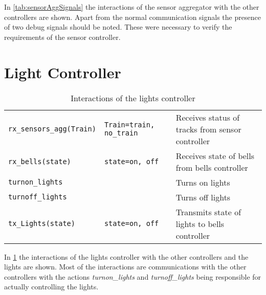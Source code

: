 \documentclass[final]{report}
\begin{document}
In \cref{tab:sensorAggSignals} the interactions of the sensor aggregator with the other controllers are shown.
Apart from the normal communication signals the presence of two debug signals should be noted.
These were necessary to verify the requirements of the sensor controller.

\section{Light Controller}
\begin{table}[H]
\centering
    \begin{tabular}{|l|l|l|}
    \hline
    \texttt{rx\_sensors\_agg(Train)} & \texttt{Train=train, no\_train} & Receives status of tracks from sensor controller \\
    \texttt{rx\_bells(state)}        & \texttt{state=on, off}          & Receives state of bells from bells controller    \\ \hline
    \texttt{turnon\_lights}          &                                 & Turns on lights                                  \\
    \texttt{turnoff\_lights}         &                                 & Turns off lights                                 \\
    \texttt{tx\_Lights(state)}       & \texttt{state=on, off}          & Transmits state of lights to bells controller    \\ \hline
    \end{tabular}
\caption{Interactions of the lights controller}
\label{tab:lightsSignals}
\end{table}

In \cref{tab:lightsSignals} the interactions of the lights controller with the other controllers and the lights are shown.
Most of the interactions are communications with the other controllers with the actions \textit{turnon\_lights} and \textit{turnoff\_lights} being responsible for actually controlling the lights.
\end{document}
